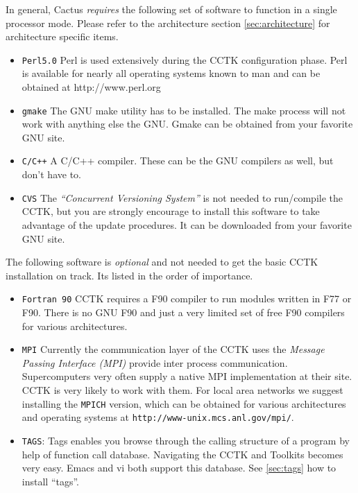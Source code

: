 In general, Cactus {\em requires} the following set of software to function
in a single processor mode. Please refer to the architecture section
\ref{sec:architecture} for architecture specific items.
\begin{itemize}
\item{\tt Perl5.0} Perl is used extensively during the CCTK
  configuration phase. Perl is available for nearly all
  operating systems known to man and can be obtained at
  http://www.perl.org
\item{\tt gmake} The GNU make utility has to be installed. The make
  process will not work with anything else the GNU.
  Gmake can be obtained from your favorite GNU site.
\item{\tt C/C++} A C/C++ compiler. These can be the GNU compilers as
  well, but don't have to.
\item{\tt CVS} The {\em ``Concurrent Versioning System''} is not needed
  to run/compile the CCTK, but you are strongly encourage to install
  this software to take advantage of the update procedures. It can be
  downloaded from your favorite GNU site.
\end{itemize}

\noindent
The following software is {\em optional} and not needed to get the
basic CCTK installation on track. Its listed in the order of importance.
\begin{itemize}
\item{\tt Fortran 90} CCTK requires a F90 compiler to run modules
  written in F77 or F90. There is no
  GNU F90 and just a very limited set of free F90 compilers for
  various architectures.
\item{\tt MPI} Currently the communication layer of the CCTK uses the
  {\em Message Passing Interface (MPI)} provide inter process
  communication. Supercomputers very often supply a native MPI
  implementation at their site. CCTK is very likely to work with
  them. For local area networks we suggest installing the {\tt MPICH}
  version, which can be obtained for various architectures and
  operating systems at {\tt http://www-unix.mcs.anl.gov/mpi/}.
\item{\tt TAGS}: Tags enables you browse through the calling structure
  of a program by help of function call database. Navigating the CCTK and
  Toolkits becomes very easy. Emacs and vi both support this database. See
  \ref{sec:tags} how to install ``tags''.
\end{itemize}


